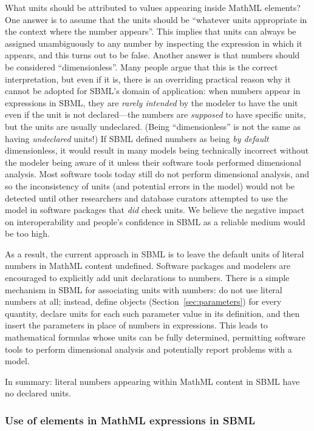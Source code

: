 What units should be attributed to values appearing inside MathML
 elements?  One answer is to assume that the units
should be ``whatever units appropriate in the context where the
number appears''.  This implies that units can always be assigned
unambiguously to any number by inspecting the expression in which
it appears, and this turns out to be false.  Another answer is
that numbers should be considered ``dimensionless''.  Many people
argue that this is the correct interpretation, but even if it is,
there is an overriding practical reason why it cannot be adopted
for SBML's domain of application: when numbers appear in 
expressions in SBML, they are \emph{rarely intended} by the
modeler to have the unit  even if
the unit is not declared---the numbers are \emph{supposed} to
have specific units, but the units are usually undeclared.  (Being
``dimensionless'' is not the same as having \emph{undeclared}
units!)  If SBML defined numbers as being \emph{by default}
dimensionless, it would result in many models being technically
incorrect without the modeler being aware of it unless their
software tools performed dimensional analysis.  Most software
tools today still do not perform dimensional analysis, and so the
inconsistency of units (and potential errors in the model) would not
be detected until other researchers and database curators
attempted to use the model in software packages that \emph{did}
check units.  We believe the negative impact on interoperability
and people's confidence in SBML as a reliable medium would be too
high.

As a result, the current approach in SBML is to leave the default
units of literal numbers in MathML content undefined.  Software
packages and modelers are encouraged to explicitly add unit
declarations to numbers.  There is a simple mechanism in SBML for
associating units with numbers: do not use literal numbers at all;
instead, define \Parameter objects (Section~\ref{sec:parameters})
for every quantity, declare units for each such parameter value in
its definition, and then insert the parameters in place of numbers
in expressions.  This leads to mathematical formulas whose units
can be fully determined, permitting software tools to perform
dimensional analysis and potentially report problems with a model.

In summary: literal numbers appearing within MathML content in
SBML have no declared units.

\subsubsection{Use of  elements in MathML expressions in SBML}
\label{sec:ci-token}

